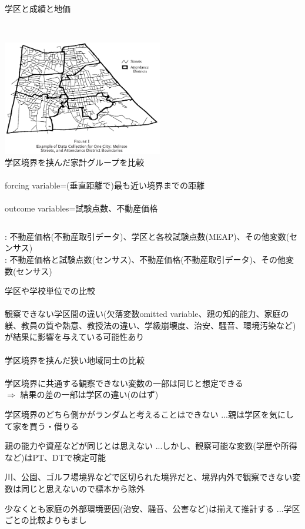 \begin{frame}{}
学区と成績と地価\citep{Black1999, BayerFerreiraMcMillan2007}\\~\\
\begin{columns}[T]
\column{.5\paperwidth}
\hfil\includegraphics[height = 5cm]{ImpactEvaluation/figure/Black_SchoolDistricts.jpg}\\
\column{.45\paperwidth}
\pause
学区境界を挟んだ家計グループを比較\\~\\
\pause
forcing variable=(垂直距離で)最も近い境界までの距離\\~\\
\pause
outcome variables=試験点数、不動産価格
\end{columns}
\pause
\citet{Black1999}: 不動産価格(不動産取引データ)、学区と各校試験点数(MEAP)、その他変数(センサス)\\
\pause
\citet{BayerFerreiraMcMillan2007}: 不動産価格と試験点数(センサス)、不動産価格(不動産取引データ)、その他変数(センサス)
\end{frame}

\begin{frame}{}
学区や学校単位での比較\\~\\
\pause
観察できない学区間の違い(欠落変数omitted variable、親の知的能力、家庭の躾、教員の質や熱意、教授法の違い、学級崩壊度、治安、騒音、環境汚染など)が結果に影響を与えている可能性あり\\~\\
\pause
学区境界を挟んだ狭い地域同士の比較\\~\\
\pause
学区境界に共通する観察できない変数の一部は同じと想定できる\\
\pause
$\Rightarrow$ 結果の差の一部は学区の違い(のはず)
\begin{dinglist}{45}
\vspace{1.0ex}\setlength{\itemsep}{1.0ex}\setlength{\baselineskip}{12pt}
\pause
\item	学区境界のどちら側かがランダムと考えることはできない
\pause
...親は学区を気にして家を買う・借りる
\pause
\item	親の能力や資産などが同じとは思えない
\pause
...しかし、観察可能な変数(学歴や所得など)はPT、DTで検定可能
\pause
\item	川、公園、ゴルフ場境界などで区切られた境界だと、境界内外で観察できない変数は同じと思えないので標本から除外
\pause
\item	少なくとも家庭の外部環境要因(治安、騒音、公害など)は揃えて推計する
\pause
...学区ごとの比較よりもまし
\end{dinglist}
\end{frame}

